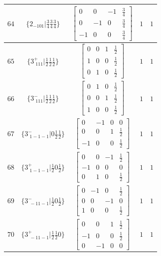 \documentclass[fleqn,8pt]{jsarticle}
\begin{document}
\begin{longtable}{ccccc}
$ 64 $ & $ \{2{}_{-101}|\frac{3}{4} \frac{3}{4} \frac{3}{4}\} $ & $ \begin{bmatrix} 0 & 0 & -1 & \frac{3}{4} \\ 0 & -1 & 0 & \frac{3}{4} \\ -1 & 0 & 0 & \frac{3}{4} \end{bmatrix} $ & $ 1 $ & $ 1 $ \\ \hline
$ 65 $ & $ \{3^{+}_{\,\,111}|\frac{1}{2} \frac{1}{2} \frac{1}{2}\} $ & $ \begin{bmatrix} 0 & 0 & 1 & \frac{1}{2} \\ 1 & 0 & 0 & \frac{1}{2} \\ 0 & 1 & 0 & \frac{1}{2} \end{bmatrix} $ & $ 1 $ & $ 1 $ \\ \hline
$ 66 $ & $ \{3^{-}_{\,\,111}|\frac{1}{2} \frac{1}{2} \frac{1}{2}\} $ & $ \begin{bmatrix} 0 & 1 & 0 & \frac{1}{2} \\ 0 & 0 & 1 & \frac{1}{2} \\ 1 & 0 & 0 & \frac{1}{2} \end{bmatrix} $ & $ 1 $ & $ 1 $ \\ \hline
$ 67 $ & $ \{3^{-}_{\,\,1-1-1}|0 \frac{1}{2} \frac{1}{2}\} $ & $ \begin{bmatrix} 0 & -1 & 0 & 0 \\ 0 & 0 & 1 & \frac{1}{2} \\ -1 & 0 & 0 & \frac{1}{2} \end{bmatrix} $ & $ 1 $ & $ 1 $ \\ \hline
$ 68 $ & $ \{3^{+}_{\,\,1-1-1}|\frac{1}{2} 0 \frac{1}{2}\} $ & $ \begin{bmatrix} 0 & 0 & -1 & \frac{1}{2} \\ -1 & 0 & 0 & 0 \\ 0 & 1 & 0 & \frac{1}{2} \end{bmatrix} $ & $ 1 $ & $ 1 $ \\ \hline
$ 69 $ & $ \{3^{-}_{\,\,-11-1}|\frac{1}{2} 0 \frac{1}{2}\} $ & $ \begin{bmatrix} 0 & -1 & 0 & \frac{1}{2} \\ 0 & 0 & -1 & 0 \\ 1 & 0 & 0 & \frac{1}{2} \end{bmatrix} $ & $ 1 $ & $ 1 $ \\ \hline
$ 70 $ & $ \{3^{+}_{\,\,-11-1}|\frac{1}{2} \frac{1}{2} 0\} $ & $ \begin{bmatrix} 0 & 0 & 1 & \frac{1}{2} \\ -1 & 0 & 0 & \frac{1}{2} \\ 0 & -1 & 0 & 0 \end{bmatrix} $ & $ 1 $ & $ 1 $ \\ \hline

\end{longtable}
\end{document}
